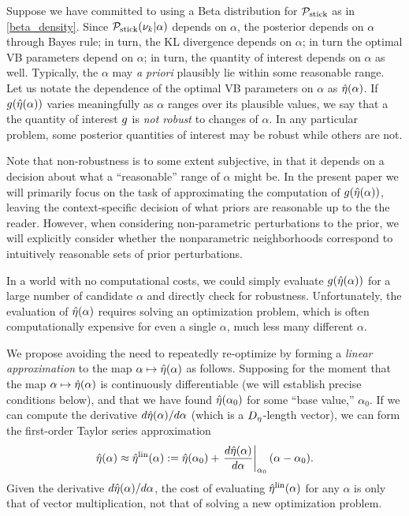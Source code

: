 Suppose we have committed to using a Beta distribution for $\mathcal{P}_{\mathrm{stick}}$ as in
\eqref{beta_density}. Since $\mathcal{P}_{\mathrm{stick}}(\nu_{k} \vert \alpha)$ depends on $\alpha$,
the posterior depends on $\alpha$ through Bayes rule; in turn, the KL divergence
depends on $\alpha$; in turn the optimal VB parameters depend on $\alpha$; in
turn, the quantity of interest depends on $\alpha$ as well. Typically, the
$\alpha$ may {\em a priori} plausibly lie within some reasonable range.  Let us
notate the dependence of the optimal VB parameters on $\alpha$ as
$\hat\eta(\alpha)$.  If $g(\hat\eta(\alpha))$ varies meaningfully as $\alpha$
ranges over its plausible values, we say that a the quantity of interest $g$ is
{\em not robust} to changes of $\alpha$.  In any particular problem, some
posterior quantities of interest may be robust while others are not.

Note that non-robustness is to some extent subjective, in that it depends on a
decision about what a ``reasonable'' range of $\alpha$ might be.  In the present
paper we will primarily focus on the task of approximating the computation of
$g(\hat\eta(\alpha))$, leaving the context-specific decision of what priors are
reasonable up to the the reader.  However, when considering non-parametric
perturbations to the prior, we will explicitly consider whether the
nonparametric neighborhoods correspond to intuitively reasonable sets of prior
perturbations.

In a world with no computational costs, we could simply evaluate
$g(\hat\eta(\alpha))$ for a large number of candidate $\alpha$ and directly
check for robustness.  Unfortunately, the evaluation of $\hat\eta(\alpha)$
requires solving an optimization problem, which is often computationally
expensive for even a single $\alpha$, much less many different $\alpha$.

We propose avoiding the need to repeatedly re-optimize by forming a {\em linear
approximation} to the map $\alpha \mapsto \hat\eta(\alpha)$ as follows. Supposing
for the moment that the map $\alpha \mapsto \hat\eta(\alpha)$ is continuously
differentiable (we will establish precise conditions below), and that we have
found $\hat\eta(\alpha_0)$ for some ``base value,'' $\alpha_0$.  If we can
compute the derivative $d \hat\eta(\alpha) / d\alpha$ (which is a
${D_{\eta}}$-length vector), we can form the first-order Taylor series
approximation
%
\begin{align*}
%
\etaopt(\alpha) \approx \etalin(\alpha) :={}
    \etaopt(\alpha_0) +
    \fracat{d \etaopt(\alpha)}{d\alpha}{\alpha_0} (\alpha - \alpha_0).
%
\end{align*}
%
Given the derivative $d \hat\eta(\alpha) / d\alpha$, the cost of evaluating
$\hat\eta^{\mathrm{lin}}(\alpha)$ for any $\alpha$ is only that of vector multiplication, not
that of solving a new optimization problem.

